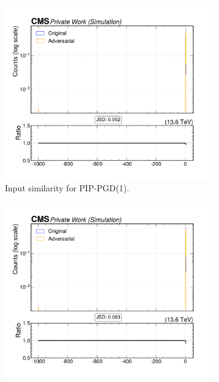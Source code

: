 \begin{figure}[htbp]
  \centering
  \begin{subfigure}[t]{0.32\textwidth}
    \includegraphics[width=\linewidth]{media/output/features/compare/combined_it_1/cmp_global_features_TagVarCSV_vertexCategory.pdf}
    \caption*{Input similarity for PIP-PGD(1).}
  \end{subfigure}\hfill
  \begin{subfigure}[t]{0.32\textwidth}
    \includegraphics[width=\linewidth]{media/output/features/compare/combined_it_2/cmp_global_features_TagVarCSV_vertexCategory.pdf}

\end{subfigure}
\end{figure}
